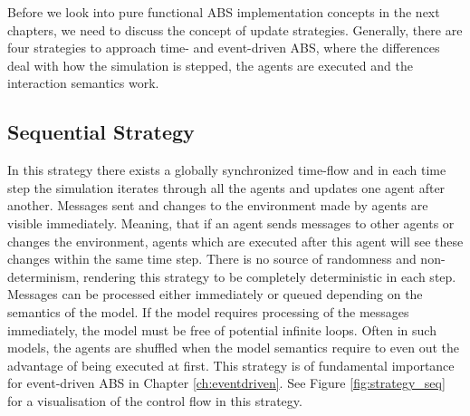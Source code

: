 Before we look into pure functional ABS implementation concepts in the next chapters, we need to discuss the concept of update strategies. Generally, there are four strategies to approach time- and event-driven ABS, where the differences deal with how the simulation is stepped, the agents are executed and the interaction semantics work.


\subsection{Sequential Strategy}
\label{sec:seq_strategy}
In this strategy there exists a globally synchronized time-flow and in each time step the simulation iterates through all the agents and updates one agent after another. Messages sent and changes to the environment made by agents are visible immediately. Meaning, that if an agent sends messages to other agents or changes the environment, agents which are executed after this agent will see these changes within the same time step. There is no source of randomness and non-determinism, rendering this strategy to be completely deterministic in each step. Messages can be processed either immediately or queued depending on the semantics of the model. If the model requires processing of the messages immediately, the model must be free of potential infinite loops. Often in such models, the agents are shuffled when the model semantics require to even out the advantage of being executed at first. This strategy is of fundamental importance for event-driven ABS in Chapter \ref{ch:eventdriven}. See Figure \ref{fig:strategy_seq} for a visualisation of the control flow in this strategy.


